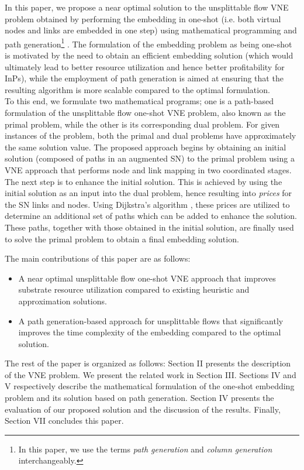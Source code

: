 \documentclass[journal]{IEEEtran}
\begin{document}
\indent In this paper, we propose a near optimal solution to the unsplittable flow VNE problem obtained by performing the embedding in one-shot (i.e. both virtual nodes and links are embedded in one step) using mathematical programming and path generation\footnote{In this paper, we use the terms \emph{path generation} and \emph{column generation} interchangeably.} \cite{Barnhart98}. The formulation of the embedding problem as being one-shot is motivated by the need to obtain an efficient embedding solution (which would ultimately lead to better resource utilization and hence better profitability for \acp{InP}), while the employment of path generation is aimed at ensuring that the resulting algorithm is more scalable compared to the optimal formulation.\\
\indent To this end, we formulate two mathematical programs; one is a path-based formulation of the unsplittable flow one-shot VNE problem, also known as the primal problem, while the other is its corresponding dual problem. For given instances of the problem, both the primal and dual problems have approximately the same solution value. The proposed approach begins by obtaining an initial solution (composed of paths in an augmented \ac{SN}) to the primal problem using a VNE approach that performs node and link mapping in two coordinated stages. The next step is to enhance the initial solution. This is achieved by using the initial solution as an input into the dual problem, hence resulting into \textit{prices} for the \ac{SN} links and nodes. Using  Dijkstra's algorithm \cite{Cormen09}, these prices are utilized to determine an additional set of paths which can be added to enhance the solution. These paths, together with those obtained in the initial solution, are finally used to solve the primal problem to obtain a final embedding solution.
 

The main contributions of this paper are as follows:
\begin{itemize}
  \item A near optimal unsplittable flow one-shot \ac{VNE} approach that improves substrate resource utilization compared to existing heuristic and approximation solutions.
  \item A path generation-based approach for unsplittable flows that significantly improves the time complexity of the embedding compared to the optimal solution.
\end{itemize}
The rest of the paper is organized as follows: Section II presents the description of the \ac{VNE} problem. We present the related work in Section III. Sections IV  and V respectively describe the mathematical formulation of the one-shot embedding problem and its solution based on path generation. Section IV presents the evaluation of our proposed solution and the discussion of the results. Finally, Section VII concludes this paper.
\end{document}
